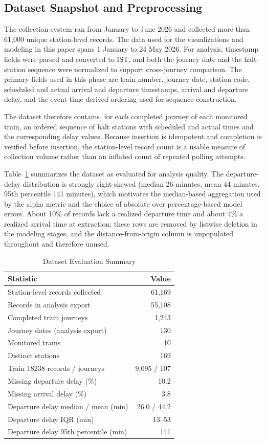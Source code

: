 \documentclass[conference]{IEEEtran}
\begin{document}
\subsection{Dataset Snapshot and Preprocessing}
The collection system ran from January to June 2026 and collected more than 61,000 unique station-level records. The data used for the visualizations and modeling in this paper spans 1 January to 24 May 2026. For analysis, timestamp fields were parsed and converted to IST, and both the journey date and the halt-station sequence were normalized to support cross-journey comparison. The primary fields used in this phase are train number, journey date, station code, scheduled and actual arrival and departure timestamps, arrival and departure delay, and the event-time-derived ordering used for sequence construction.

The dataset therefore contains, for each completed journey of each monitored train, an ordered sequence of halt stations with scheduled and actual times and the corresponding delay values. Because insertion is idempotent and completion is verified before insertion, the station-level record count is a usable measure of collection volume rather than an inflated count of repeated polling attempts.

Table~\ref{tab:dataset_stats} summarizes the dataset as evaluated for analysis quality. The departure-delay distribution is strongly right-skewed (median 26 minutes, mean 44 minutes, 95th percentile 141 minutes), which motivates the median-based aggregation used by the alpha metric and the choice of absolute over percentage-based model errors. About 10\% of records lack a realized departure time and about 4\% a realized arrival time at extraction; these rows are removed by listwise deletion in the modeling stages, and the distance-from-origin column is unpopulated throughout and therefore unused.

\begin{table}[!t]
\centering
\caption{Dataset Evaluation Summary}
\label{tab:dataset_stats}
\footnotesize
\setlength{\tabcolsep}{4pt}
\begin{tabular}{@{}lr@{}}
\toprule
Statistic & Value \\
\midrule
Station-level records collected & 61{,}169 \\
Records in analysis export & 55{,}108 \\
Completed train journeys & 1{,}243 \\
Journey dates (analysis export) & 130 \\
Monitored trains & 10 \\
Distinct stations & 169 \\
Train 18238 records / journeys & 9{,}095 / 107 \\
Missing departure delay (\%) & 10.2 \\
Missing arrival delay (\%) & 3.8 \\
Departure delay median / mean (min) & 26.0 / 44.2 \\
Departure delay IQR (min) & 13--53 \\
Departure delay 95th percentile (min) & 141 \\
\bottomrule
\end{tabular}
\end{table}
\end{document}
